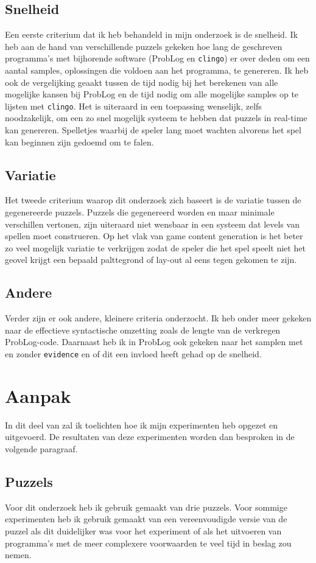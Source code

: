 \documentclass{article}
\begin{document}
	\subsection{Snelheid}
	Een eerste criterium dat ik heb behandeld in mijn onderzoek is de snelheid. Ik heb aan de hand van verschillende puzzels gekeken hoe lang de geschreven programma's met bijhorende software (ProbLog en \texttt{clingo}) er over deden om een aantal samples, oplossingen die voldoen aan het programma, te genereren. Ik heb ook de vergelijking geaakt tussen de tijd nodig bij het berekenen van alle mogelijke kansen bij ProbLog en de tijd nodig om alle mogelijke samples op te lijsten met \texttt{clingo}. Het is uiteraard in een toepassing wenselijk, zelfs noodzakelijk, om een zo snel mogelijk systeem te hebben dat puzzels in real-time kan genereren. Spelletjes waarbij de speler lang moet wachten alvorens het spel kan beginnen zijn gedoemd om te falen.
	
	\subsection{Variatie}
	Het tweede criterium waarop dit onderzoek zich baseert is de variatie tussen de gegenereerde puzzels. Puzzels die gegenereerd worden en maar minimale verschillen vertonen, zijn uiteraard niet wensbaar in een systeem dat levels van spellen moet construeren. Op het vlak van game content generation is het beter zo veel mogelijk variatie te verkrijgen zodat de speler die het spel speelt niet het geovel krijgt een bepaald palttegrond of lay-out al eens tegen gekomen te zijn.

	\subsection{Andere}
	Verder zijn er ook andere, kleinere criteria onderzocht. Ik heb onder meer gekeken naar de effectieve syntactische omzetting zoals de lengte van de verkregen ProbLog-code. Daarnaast heb ik in ProbLog ook gekeken naar het samplen met en zonder \texttt{evidence} en of dit een invloed heeft gehad op de snelheid.

\section{Aanpak}
In dit deel van zal ik toelichten hoe ik mijn experimenten heb opgezet en uitgevoerd. De resultaten van deze experimenten worden dan besproken in de volgende paragraaf.
	\subsection{Puzzels}
	Voor dit onderzoek heb ik gebruik gemaakt van drie puzzels. Voor sommige experimenten heb ik gebruik gemaakt van een vereenvoudigde versie van de puzzel als dit duidelijker was voor het experiment of als het uitvoeren van programma's met de meer complexere voorwaarden te veel tijd in beslag zou nemen.
	
\end{document}
